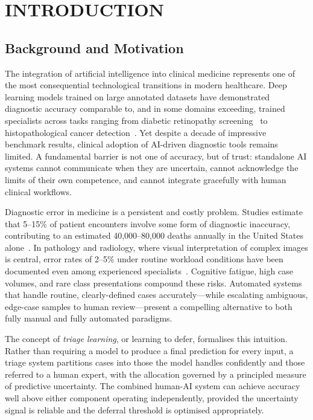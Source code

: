 
\chapter{INTRODUCTION}

\section{Background and Motivation}

The integration of artificial intelligence into clinical medicine represents one of the most consequential technological transitions in modern healthcare. Deep learning models trained on large annotated datasets have demonstrated diagnostic accuracy comparable to, and in some domains exceeding, trained specialists across tasks ranging from diabetic retinopathy screening~\cite{gulshan2016development} to histopathological cancer detection~\cite{esteva2017dermatologist}. Yet despite a decade of impressive benchmark results, clinical adoption of AI-driven diagnostic tools remains limited. A fundamental barrier is not one of accuracy, but of trust: standalone AI systems cannot communicate when they are uncertain, cannot acknowledge the limits of their own competence, and cannot integrate gracefully with human clinical workflows.

Diagnostic error in medicine is a persistent and costly problem. Studies estimate that 5--15\% of patient encounters involve some form of diagnostic inaccuracy, contributing to an estimated 40,000--80,000 deaths annually in the United States alone~\cite{leape1994error}. In pathology and radiology, where visual interpretation of complex images is central, error rates of 2--5\% under routine workload conditions have been documented even among experienced specialists~\cite{raab2005clinical}. Cognitive fatigue, high case volumes, and rare class presentations compound these risks. Automated systems that handle routine, clearly-defined cases accurately—while escalating ambiguous, edge-case samples to human review—present a compelling alternative to both fully manual and fully automated paradigms.

The concept of \textit{triage learning}, or learning to defer, formalises this intuition. Rather than requiring a model to produce a final prediction for every input, a triage system partitions cases into those the model handles confidently and those referred to a human expert, with the allocation governed by a principled measure of predictive uncertainty. The combined human-AI system can achieve accuracy well above either component operating independently, provided the uncertainty signal is reliable and the deferral threshold is optimised appropriately.

